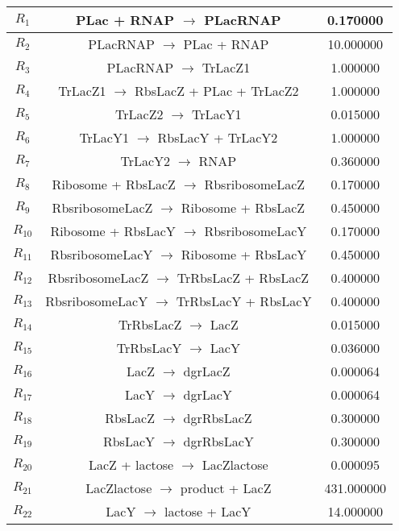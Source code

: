 \begin{center} 
\begin{tabular}{ c | c | c } 
\hline 
 $R_{1}$  &   PLac + RNAP $\longrightarrow$ PLacRNAP   &  0.170000  \\  \hline 
 $R_{2}$  &   PLacRNAP $\longrightarrow$ PLac + RNAP   &  10.000000  \\  \hline 
 $R_{3}$  &   PLacRNAP $\longrightarrow$ TrLacZ1   &  1.000000  \\  \hline 
 $R_{4}$  &   TrLacZ1 $\longrightarrow$ RbsLacZ + PLac + TrLacZ2   &  1.000000  \\  \hline 
 $R_{5}$  &   TrLacZ2 $\longrightarrow$ TrLacY1   &  0.015000  \\  \hline 
 $R_{6}$  &   TrLacY1 $\longrightarrow$ RbsLacY + TrLacY2   &  1.000000  \\  \hline 
 $R_{7}$  &   TrLacY2 $\longrightarrow$ RNAP   &  0.360000  \\  \hline 
 $R_{8}$  &   Ribosome + RbsLacZ $\longrightarrow$ RbsribosomeLacZ   &  0.170000  \\  \hline 
 $R_{9}$  &   RbsribosomeLacZ $\longrightarrow$ Ribosome + RbsLacZ   &  0.450000  \\  \hline 
 $R_{10}$  &   Ribosome + RbsLacY $\longrightarrow$ RbsribosomeLacY   &  0.170000  \\  \hline 
 $R_{11}$  &   RbsribosomeLacY $\longrightarrow$ Ribosome + RbsLacY   &  0.450000  \\  \hline 
 $R_{12}$  &   RbsribosomeLacZ $\longrightarrow$ TrRbsLacZ + RbsLacZ   &  0.400000  \\  \hline 
 $R_{13}$  &   RbsribosomeLacY $\longrightarrow$ TrRbsLacY + RbsLacY   &  0.400000  \\  \hline 
 $R_{14}$  &   TrRbsLacZ $\longrightarrow$ LacZ   &  0.015000  \\  \hline 
 $R_{15}$  &   TrRbsLacY $\longrightarrow$ LacY   &  0.036000  \\  \hline 
 $R_{16}$  &   LacZ $\longrightarrow$ dgrLacZ   &  0.000064  \\  \hline 
 $R_{17}$  &   LacY $\longrightarrow$ dgrLacY   &  0.000064  \\  \hline 
 $R_{18}$  &   RbsLacZ $\longrightarrow$ dgrRbsLacZ   &  0.300000  \\  \hline 
 $R_{19}$  &   RbsLacY $\longrightarrow$ dgrRbsLacY   &  0.300000  \\  \hline 
 $R_{20}$  &   LacZ + lactose $\longrightarrow$ LacZlactose   &  0.000095  \\  \hline 
 $R_{21}$  &   LacZlactose $\longrightarrow$ product + LacZ   &  431.000000  \\  \hline 
 $R_{22}$  &   LacY $\longrightarrow$ lactose + LacY   &  14.000000  \\  \hline 
\end{tabular} 
\end{center} 

